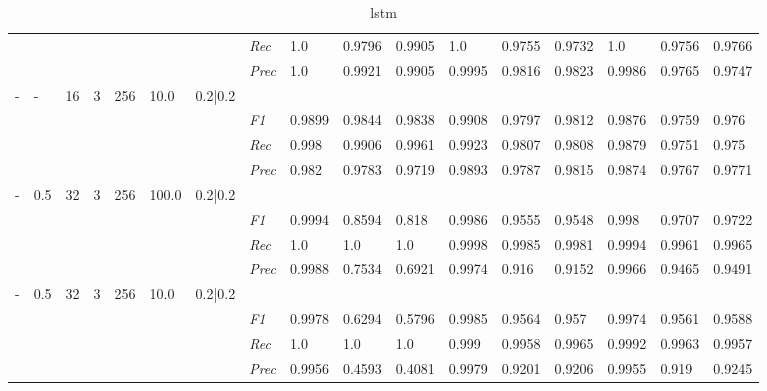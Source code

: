 \begin{table}[]
\begin{tabularx}{\textwidth}{XXXXXXX|X|XXX|XXX|XXX}
    & & & & & & & \textit{Rec} & 1.0 & 0.9796 & 0.9905    & 1.0 & 0.9755    & 0.9732    & 1.0    & 0.9756    & 0.9766    \\
    & & & & & & & \textit{Prec} & 1.0 & 0.9921 & 0.9905 & 0.9995 & 0.9816 & 0.9823 & 0.9986 & 0.9765 & 0.9747 \\ \midrule
    - & - & 16 & 3 & 256 &10.0 & 0.2|0.2 & & & & & & & & & \\
    & & & & & & & \textit{F1} & 0.9899 & 0.9844 & 0.9838 & 0.9908 & 0.9797        & 0.9812        & 0.9876        & 0.9759        & 0.976        \\
    & & & & & & & \textit{Rec} & 0.998 & 0.9906 & 0.9961    & 0.9923 & 0.9807    & 0.9808    & 0.9879    & 0.9751    & 0.975    \\
    & & & & & & & \textit{Prec} & 0.982 & 0.9783 & 0.9719 & 0.9893 & 0.9787 & 0.9815 & 0.9874 & 0.9767 & 0.9771 \\ \midrule
    - & 0.5 & 32 & 3 & 256 &100.0 & 0.2|0.2 & & & & & & & & & \\
    & & & & & & & \textit{F1} & 0.9994 & 0.8594 & 0.818 & 0.9986 & 0.9555        & 0.9548        & 0.998        & 0.9707        & 0.9722        \\
    & & & & & & & \textit{Rec} & 1.0 & 1.0 & 1.0    & 0.9998 & 0.9985    & 0.9981    & 0.9994    & 0.9961    & 0.9965    \\
    & & & & & & & \textit{Prec} & 0.9988 & 0.7534 & 0.6921 & 0.9974 & 0.916 & 0.9152 & 0.9966 & 0.9465 & 0.9491 \\ \midrule
    - & 0.5 & 32 & 3 & 256 &10.0 & 0.2|0.2 & & & & & & & & & \\
    & & & & & & & \textit{F1} & 0.9978 & 0.6294 & 0.5796 & 0.9985 & 0.9564        & 0.957        & 0.9974        & 0.9561        & 0.9588        \\
    & & & & & & & \textit{Rec} & 1.0 & 1.0 & 1.0    & 0.999 & 0.9958    & 0.9965    & 0.9992    & 0.9963    & 0.9957    \\
    & & & & & & & \textit{Prec} & 0.9956 & 0.4593 & 0.4081 & 0.9979 & 0.9201 & 0.9206 & 0.9955 & 0.919 & 0.9245 \\ \midrule
    \end{tabularx}
    \caption{lstm}
    \label{tab:all_results_lstm}
    \end{table}


